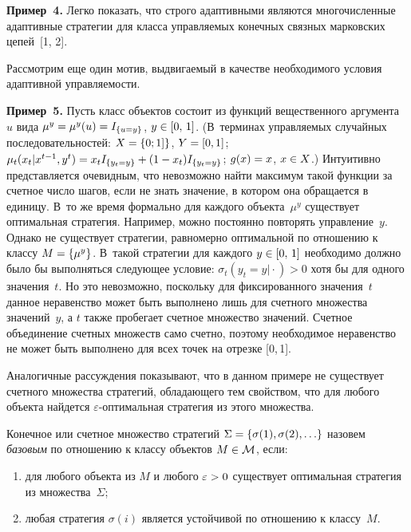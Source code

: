 \begin{multicols}{2}
  \noindent
  \textbf{Пример~4.} Легко показать, что строго адаптивными являются 
многочисленные адаптивные стратегии для класса управляемых конечных связных 
марковских цепей~[1, 2].
  
  Рассмотрим еще один мотив, выдвигаемый в качестве необходимого условия 
адаптивной управ\-ля\-емости.
  
  \medskip
  
  \noindent
  \textbf{Пример~5.} Пусть класс объектов состоит из функций вещественного 
аргумента~$u$ вида $\mu^y\hm=\mu^y(u)\hm=I_{\{u=y\}}$, $y\hm\in [0,\,1]$. (В~терминах 
управляемых случайных последовательностей: $X\hm= \{0;1]\}$, $Y\hm=[0,1]$; 
$\mu_t(x_t\vert x^{t-1},y^t)\hm=x_t I_{\{y_t=y\}}+ (1-x_t)I_{\{y_t=y\}}$; $g(x)\hm=x$, 
$x\hm\in X$.) Интуитивно представляется очевидным, что невозможно найти максимум 
такой функции за счетное число шагов, если не знать значение, в котором она обращается 
в единицу. В~то же время формально для каждого объекта~$\mu^y$ существует 
оптимальная стратегия. Например, можно постоянно повторять управление~$y$. Однако 
не существует стратегии, равномерно оптимальной по отношению к классу 
$M\hm=\{\mu^y\}$. В~такой стратегии для каждого $y\hm\in [0,\,1]$ необходимо должно 
было бы выполняться следующее условие: $\sigma_t(y_t=y\vert \cdot)>0$ хотя бы для 
одного значения~$t$. Но это невозможно, поскольку для фиксированного значения~$t$ 
данное неравенство может быть выполнено лишь для счетного множества значений~$y$, а 
$t$ также пробегает счетное множество значений. Счетное объединение счетных 
множеств само счетно, поэтому необходимое неравенство не может быть выполнено для 
всех точек на отрезке [0,\,1].
  
  Аналогичные рассуждения показывают, что в данном примере не существует счетного 
множества стратегий, обладающего тем свойством, что для любого объекта найдется 
$\varepsilon$-оп\-ти\-маль\-ная стратегия из этого множества.
  
  Конечное или счетное множество стратегий $\Sigma\hm=\{\sigma(1),\sigma(2), \ldots \}$ 
назовем \textit{базовым} по отношению к классу объектов $M\hm\in \mathcal{M}$, если:
  \begin{enumerate}[(1)]
  \item для любого объекта из $M$ и любого $\varepsilon\hm>0$ существует оптимальная 
стратегия из множества~$\Sigma$;
  \item любая стратегия $\sigma(i)$ является устойчивой по отношению к классу~$M$.
  \end{enumerate}
  

\end{multicols}
